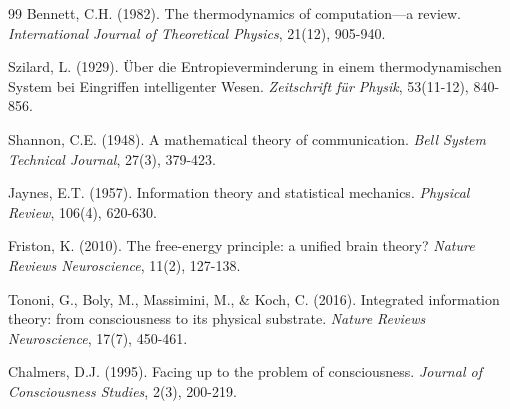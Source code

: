 \documentclass[12pt,a4paper]{article}
\begin{document}
\begin{thebibliography}{99}
Bennett, C.H. (1982). The thermodynamics of computation—a review. \textit{International Journal of Theoretical Physics}, 21(12), 905-940.

Szilard, L. (1929). Über die Entropieverminderung in einem thermodynamischen System bei Eingriffen intelligenter Wesen. \textit{Zeitschrift für Physik}, 53(11-12), 840-856.

Shannon, C.E. (1948). A mathematical theory of communication. \textit{Bell System Technical Journal}, 27(3), 379-423.

Jaynes, E.T. (1957). Information theory and statistical mechanics. \textit{Physical Review}, 106(4), 620-630.

Friston, K. (2010). The free-energy principle: a unified brain theory? \textit{Nature Reviews Neuroscience}, 11(2), 127-138.

Tononi, G., Boly, M., Massimini, M., \& Koch, C. (2016). Integrated information theory: from consciousness to its physical substrate. \textit{Nature Reviews Neuroscience}, 17(7), 450-461.

Chalmers, D.J. (1995). Facing up to the problem of consciousness. \textit{Journal of Consciousness Studies}, 2(3), 200-219.

\end{thebibliography}
\end{document}
